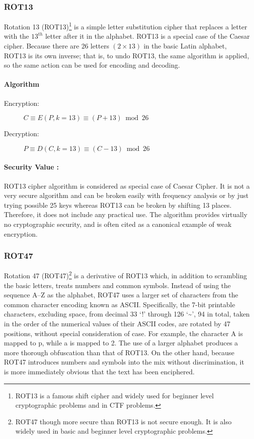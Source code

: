 \documentclass[british]{article}
\begin{document}
\subsubsection{ROT13}

Rotation 13 (ROT13)\footnote{ROT13 is a famous shift cipher and widely used for beginner level
cryptographic problems and in CTF problems.} is a simple letter substitution cipher that replaces a letter with
the $13^{th}$ letter after it in the alphabet. ROT13 is a special
case of the Caesar cipher. Because there are 26 letters $(2\times13)$
in the basic Latin alphabet, ROT13 is its own inverse; that is, to
undo ROT13, the same algorithm is applied, so the same action can
be used for encoding and decoding.

\paragraph{Algorithm}
\begin{description}
\item [{Encryption:}] $C\equiv E(P,k=13)\equiv(P+13)\bmod26$
\item [{Decryption:}] $P\equiv D(C,k=13)\equiv(C-13)\bmod26$
\end{description}

\paragraph{Security Value : }

ROT13 cipher algorithm is considered as special case of Caesar Cipher.
It is not a very secure algorithm and can be broken easily with frequency
analysis or by just trying possible 25 keys whereas ROT13 can be broken
by shifting 13 places. Therefore, it does not include any practical
use. The algorithm provides virtually no cryptographic security, and
is often cited as a canonical example of weak encryption.

\subsubsection{ROT47}

Rotation 47 (ROT47)\footnote{ROT47 though more secure than ROT13 is not secure enough. It is also
widely used in basic and beginner level cryptographic problems.} is a derivative of ROT13 which, in addition to scrambling the basic
letters, treats numbers and common symbols. Instead of using the sequence
A--Z as the alphabet, ROT47 uses a larger set of characters from
the common character encoding known as ASCII. Specifically, the 7-bit
printable characters, excluding space, from decimal 33 `!' through
126 `\textasciitilde ', 94 in total, taken in the order of the
numerical values of their ASCII codes, are rotated by 47 positions,
without special consideration of case. For example, the character
A is mapped to p, while a is mapped to 2. The use of a larger alphabet
produces a more thorough obfuscation than that of ROT13. On the other
hand, because ROT47 introduces numbers and symbols into the mix without
discrimination, it is more immediately obvious that the text has been
enciphered.
\end{document}
